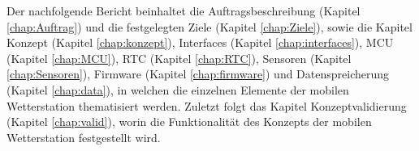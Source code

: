Der nachfolgende Bericht beinhaltet die Auftragsbeschreibung (Kapitel \ref{chap:Auftrag}) und die festgelegten Ziele (Kapitel \ref{chap:Ziele}), sowie die Kapitel Konzept (Kapitel \ref{chap:konzept}), Interfaces (Kapitel \ref{chap:interfaces}), MCU (Kapitel \ref{chap:MCU}), RTC (Kapitel \ref{chap:RTC}), Sensoren (Kapitel \ref{chap:Sensoren}), Firmware (Kapitel \ref{chap:firmware}) und Datenspreicherung (Kapitel \ref{chap:data}), in welchen die einzelnen Elemente der mobilen Wetterstation thematisiert werden. Zuletzt folgt das Kapitel Konzeptvalidierung (Kapitel \ref{chap:valid}), worin die Funktionalität des Konzepts der mobilen Wetterstation festgestellt wird.
